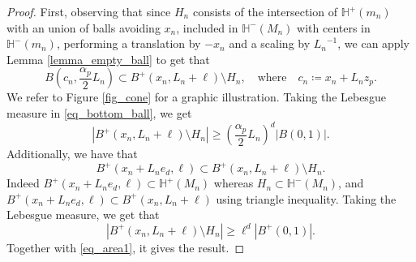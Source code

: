 \documentclass[a4paper, 11pt]{article}
\theoremstyle{plain}
\theoremstyle{definition}
\numberwithin{equation}{section}
\begin{document}
\begin{proof}
    First, observing that since $H_n$ consists of the intersection of $\mathbb H^+(m_n)$ with an union of balls avoiding $x_n$, included in $\mathbb H^-(M_n)$ with centers in $\mathbb H^-(m_n)$, performing a translation by $-x_n$ and a scaling by ${L_n}^{-1}$, we can apply Lemma \ref{lemma_empty_ball} to get that
        \begin{equation}
            \label{eq_bottom_ball}
            B\left(c_n, \frac{\alpha_p}{2}L_n\right)\subset B^+(x_n, L_n+\ell)\setminus H_n,\quad\text{where}\quad c_n\coloneqq x_n+L_n z_p.
        \end{equation}
    We refer to Figure \ref{fig_cone} for a graphic illustration. Taking the Lebesgue measure in \eqref{eq_bottom_ball}, we get
        \begin{equation}
            \label{eq_area1}
            |B^+(x_n, L_n+\ell)\setminus H_n|\geq\left(\frac{\alpha_p}{2}L_n\right)^d|B(0,1)|.
        \end{equation}
    Additionally, we have that
        \[B^+(x_n+L_n e_d,\ell)\subset B^+(x_n, L_n+\ell)\setminus H_n.\]
    Indeed $B^+(x_n+L_n e_d,\ell)\subset\mathbb H^+(M_n)$ whereas $H_n\subset\mathbb H^-(M_n)$, and $B^+(x_n+L_n e_d,\ell)\subset B^+(x_n, L_n+\ell)$ using triangle inequality. Taking the Lebesgue measure, we get that
        \[|B^+(x_n, L_n+\ell)\setminus H_n|\geq \ell^d|B^+(0, 1)|.\]
    Together with \eqref{eq_area1}, it gives the result.

\end{proof}
\end{document}
